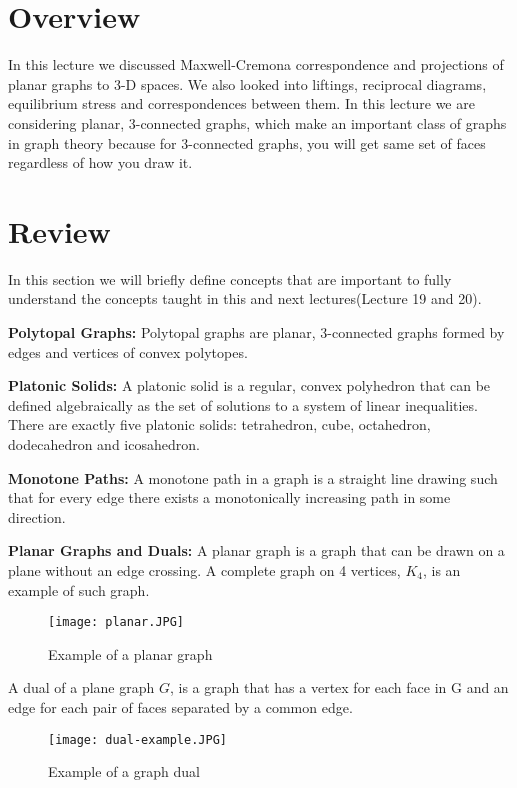 \documentclass{article}
\begin{document}
    
    \section{Overview}
    In this lecture we discussed Maxwell-Cremona correspondence and projections of planar graphs to 3-D spaces. We also looked into liftings, reciprocal diagrams, equilibrium stress and correspondences between them. In this lecture we are considering planar, 3-connected graphs, which make an important class of graphs in graph theory because for 3-connected graphs, you will get same set of faces regardless of how you draw it.
    
    
    
    
    \section{Review}
    In this section we will briefly define concepts that are important to fully understand the concepts taught in this and next lectures(Lecture 19 and 20).
    
    \textbf{Polytopal Graphs:} Polytopal graphs are planar, 3-connected graphs formed by edges and vertices of convex polytopes. 
    
    \textbf{Platonic Solids:} A platonic solid is a regular, convex polyhedron that can be defined algebraically as the set of solutions to a system of linear inequalities. There are exactly five platonic solids: tetrahedron, cube, 	octahedron, dodecahedron and icosahedron.
    
    \textbf{Monotone Paths:} A monotone path in a graph is a straight line drawing such that for every edge there exists a monotonically increasing path in some direction.
    
    \textbf{Planar Graphs and Duals:} A planar graph is a graph that can be drawn on a plane without an edge crossing. A complete graph on 4 vertices, ${K_4}$, is an example of such graph.
    
    \begin{figure}[H]
        \centering
        \texttt{[image: planar.JPG]}
        \caption{Example of a planar graph}
        \label{fig:planar-graph}
    \end{figure}
    
    A dual of a plane graph $G$, is a graph that has a vertex for each face in G and an edge for each pair of faces separated by a common edge.
    \begin{figure}[H]
        \centering
        \texttt{[image: dual-example.JPG]}
        \caption{Example of a graph dual}
        \label{fig:dual-example}
    \end{figure}
    
\end{document}
